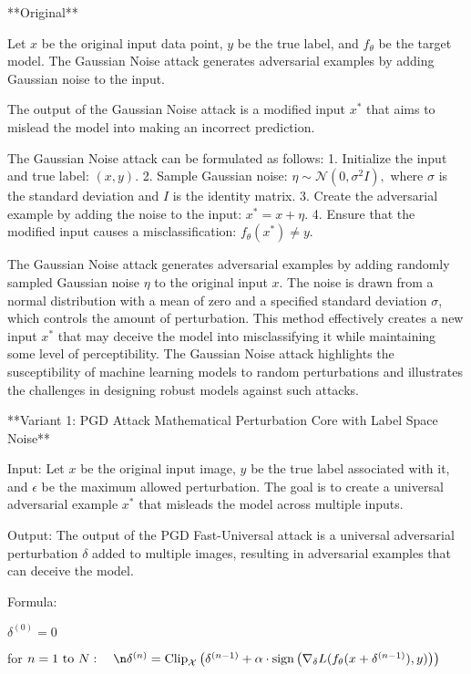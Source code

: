 
**Original**

Let \( x \) be the original input data point, \( y \) be the true label, and \( f_{\theta} \) be the target model. The Gaussian Noise attack generates adversarial examples by adding Gaussian noise to the input.

The output of the Gaussian Noise attack is a modified input \( x^* \) that aims to mislead the model into making an incorrect prediction.

The Gaussian Noise attack can be formulated as follows:
1. Initialize the input and true label:
   $
   (x, y).
   $
2. Sample Gaussian noise:
   $
   \eta \sim \mathcal{N}(0, \sigma^2 I),
   $
   where \( \sigma \) is the standard deviation and \( I \) is the identity matrix.
3. Create the adversarial example by adding the noise to the input:
   $
   x^* = x + \eta.
   $
4. Ensure that the modified input causes a misclassification:
   $
   f_{\theta}(x^*) \neq y.
   $

The Gaussian Noise attack generates adversarial examples by adding randomly sampled Gaussian noise \( \eta \) to the original input \( x \). The noise is drawn from a normal distribution with a mean of zero and a specified standard deviation \( \sigma \), which controls the amount of perturbation. This method effectively creates a new input \( x^* \) that may deceive the model into misclassifying it while maintaining some level of perceptibility. The Gaussian Noise attack highlights the susceptibility of machine learning models to random perturbations and illustrates the challenges in designing robust models against such attacks.


**Variant 1: PGD Attack Mathematical Perturbation Core with Label Space Noise**

Input: Let $x$ be the original input image, $y$ be the true label associated with it, and $\epsilon$ be the maximum allowed perturbation. The goal is to create a universal adversarial example $x^*$ that misleads the model across multiple inputs.

Output: The output of the PGD Fast-Universal attack is a universal adversarial perturbation $\delta$ added to multiple images, resulting in adversarial examples that can deceive the model.

Formula:

$\delta^{(0)} = 0$

for $n = 1 \text{ to } N: \quad\n\delta^{(n)} = \text{Clip}_{\mathcal{X}} \left( \delta^{(n-1)} + \alpha \cdot \text{sign} \left( \nabla_\delta L(f_\theta(x + \delta^{(n-1)}), y) \right) \right)$

